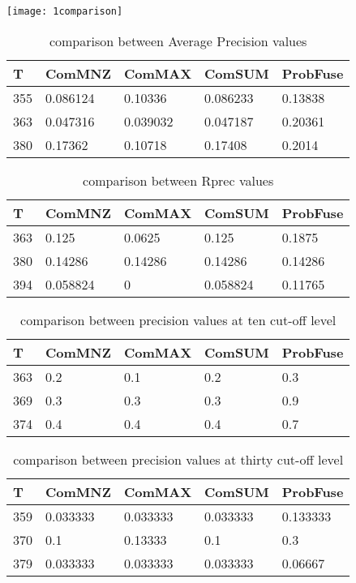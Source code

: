 \documentclass[12pt,journal]{IEEEtran}
\begin{document}
\begin{wrapfigure}
\centering
\texttt{[image: 1comparison]}
\end{wrapfigure}


\begin{table}[h!]
\centering
\caption{comparison between Average Precision values}
\begin{tabular}{|l|l|l|l|l|}
\hline
T   & ComMNZ    & ComMAX   & ComSUM    & ProbFuse \\ \hline
355 & 0.086124  & 0.10336  & 0.086233  & 0.13838 \\ \hline
363 & 0.047316  & 0.039032 & 0.047187  & 0.20361  \\ \hline
380 & 0.17362   & 0.10718  & 0.17408   & 0.2014 \\ \hline
\end{tabular}
\end{table}

\begin{table}[h!]
\centering
\caption{comparison between Rprec values}
\begin{tabular}{|l|l|l|l|l|}
\hline
T   & ComMNZ   & ComMAX  & ComSUM   & ProbFuse \\ \hline
363 & 0.125    & 0.0625  & 0.125    & 0.1875     \\ \hline
380 & 0.14286  & 0.14286 & 0.14286  & 0.14286  \\ \hline
394 & 0.058824 & 0       & 0.058824 & 0.11765  \\  \hline
\end{tabular} 
\end{table}


\begin{table}[h!]
\centering
\caption{comparison between precision values at ten cut-off level}
\begin{tabular}{|l|l|l|l|l|}
\hline
T   & ComMNZ & ComMAX & ComSUM & ProbFuse \\ \hline
363 & 0.2    & 0.1    & 0.2    & 0.3     \\ \hline
369 & 0.3    & 0.3    & 0.3    & 0.9     \\ \hline
374 & 0.4    & 0.4    & 0.4    & 0.7      \\ \hline
\end{tabular}
\end{table}

\begin{table}[h!]
\centering
\caption{comparison between precision values at thirty cut-off level}
\begin{tabular}{|l|l|l|l|l|}
\hline
T   & ComMNZ   & ComMAX   & ComSUM   & ProbFuse \\ \hline
359 & 0.033333 & 0.033333 & 0.033333 & 0.133333  \\ \hline
370 & 0.1      & 0.13333  & 0.1      & 0.3  \\ \hline
379 & 0.033333 & 0.033333 & 0.033333 & 0.06667     \\ \hline
\end{tabular}
\end{table}
\end{document}
